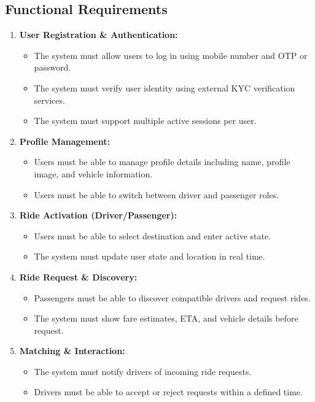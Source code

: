\documentclass[10pt,a4paper]{report}
\begin{document}
\subsection{Functional Requirements}
\large\justify
\begin{enumerate}
    \item \textbf{User Registration \& Authentication:}
    \begin{itemize}
        \item The system must allow users to log in using mobile number and OTP or password.
        \item The system must verify user identity using external KYC verification services.
        \item The system must support multiple active sessions per user.
    \end{itemize}

    \item \textbf{Profile Management:}
    \begin{itemize}
        \item Users must be able to manage profile details including name, profile image, and vehicle information.
        \item Users must be able to switch between driver and passenger roles.
    \end{itemize}

    \item \textbf{Ride Activation (Driver/Passenger):}
    \begin{itemize}
        \item Users must be able to select destination and enter active state.
        \item The system must update user state and location in real time.
    \end{itemize}

    \item \textbf{Ride Request \& Discovery:}
    \begin{itemize}
        \item Passengers must be able to discover compatible drivers and request rides.
        \item The system must show fare estimates, ETA, and vehicle details before request.
    \end{itemize}

    \item \textbf{Matching \& Interaction:}
    \begin{itemize}
        \item The system must notify drivers of incoming ride requests.
        \item Drivers must be able to accept or reject requests within a defined time.
    \end{itemize}


\end{enumerate}
\end{document}
